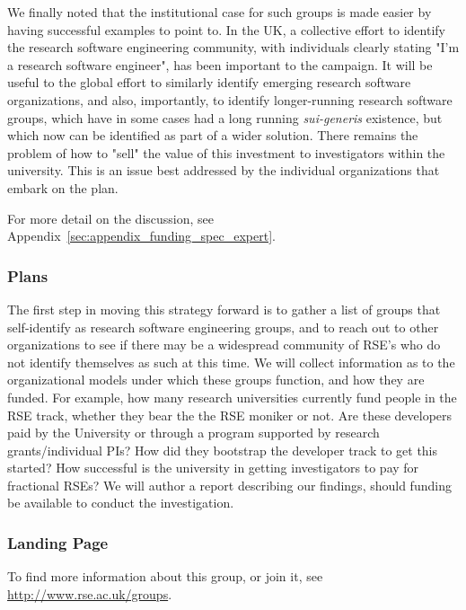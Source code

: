 We finally noted that the institutional case for such groups is made easier by having successful examples to point to. In the
UK, a collective effort to identify the research software engineering community, with individuals clearly stating "I'm a research software engineer", has been important to the campaign. It will be useful to the global effort to similarly identify emerging research software organizations, and also, importantly, to identify longer-running research software groups, which have in some cases had a long running \emph{sui-generis} existence, but which now can be identified as part of a wider solution. There remains the problem of how to "sell" the value of this investment to investigators within the university. This is an issue best addressed by the individual organizations that embark on the plan. 

For more detail on the discussion, see Appendix~\ref{sec:appendix_funding_spec_expert}.

\subsubsection{Plans}

The first step in moving this strategy forward is to gather a list of groups that self-identify as research software engineering groups, and to reach out to other organizations to see if there may be a widespread community of RSE's who do not identify themselves as such at this time. We will collect information as to the organizational models under which these groups function, and how they are funded. For example, how many research universities currently fund people in the RSE track, whether they bear the the RSE moniker or not. Are these developers paid by the University or through a program supported by research grants/individual PIs? How did they bootstrap the developer track to get this started? How successful is the university in getting investigators to pay for fractional RSEs?  We will author a report describing our findings, should funding be available to conduct the investigation. 

\subsubsection{Landing Page}

To find more information about this group, or join it, see \url{http://www.rse.ac.uk/groups}.
